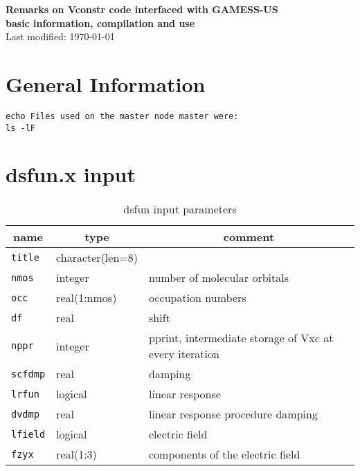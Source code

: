 \documentclass[10pt]{article}
\begin{document}
\thispagestyle{first}
\footnotesize

\begin{center}
    \Large{\textbf{Remarks on Vconstr code interfaced with GAMESS-US}} \\ 
    \normalsize{\textbf{basic information, compilation and use}} \\
    \normalsize{Last modified: \today}
\end{center}

\section{General Information}
\begin{verbatim}
echo Files used on the master node master were:
ls -lF 
\end{verbatim}
\section{dsfun.x input}        
    \begin{table}[H]
        \begin{center}
        \caption{\label{tab:dsfun-input}dsfun input parameters}
        \begin{tabular*}{0.6\textwidth}{lll}
        \toprule
        \multicolumn{1}{c}{name} & \multicolumn{1}{c}{type} & \multicolumn{1}{c}{comment} \\ \midrule
        \verb!title! & character(len=8) & \\
        \verb!nmos!  & integer & number of molecular orbitals \\
        \verb!occ!   & real(1:nmos) & occupation numbers \\
        \verb!df!    & real & shift \\
        \verb!nppr!  & integer & pprint, intermediate storage of Vxc at every iteration \\
        \verb!scfdmp! & real & damping \\
        \verb!lrfun! & logical & linear response \\
        \verb!dvdmp! & real & linear response procedure damping \\
        \verb!lfield! & logical & electric field \\
        \verb!fzyx! & real(1:3) & components of the electric field \\
        \bottomrule
        \end{tabular*}
        \end{center}
    \end{table}


\end{document}
